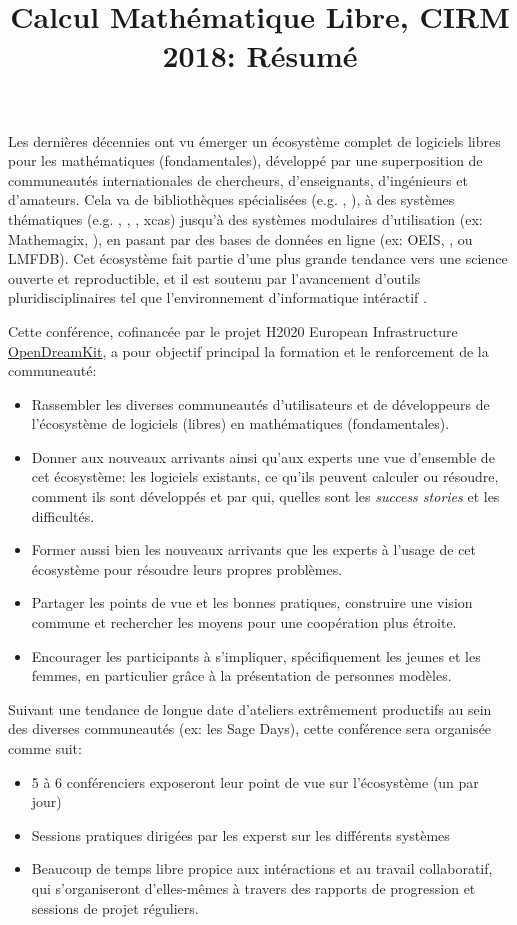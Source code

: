 \documentclass[12pt]{amsbook}
\begin{document}
\title{Calcul Mathématique Libre, CIRM 2018: Résumé}
\maketitle
Les dernières décennies ont vu émerger un écosystème complet de logiciels libres pour les mathématiques (fondamentales), développé par une  superposition de communeautés internationales de chercheurs, d'enseignants, d'ingénieurs et d'amateurs. Cela va de bibliothèques spécialisées (e.g. \MPIR, \Linbox), à des systèmes thématiques (e.g. \GAP, \Pari, \Singular, xcas) jusqu'à des systèmes  modulaires d'utilisation (ex: Mathemagix, \Sage), en pasant par des bases de données en ligne (ex: OEIS, \MathHub, ou LMFDB). Cet écosystème fait partie d'une plus grande tendance vers une science ouverte et reproductible,  et il est soutenu par l'avancement d'outils pluridisciplinaires tel que l'environnement d'informatique intéractif \Jupyter.


Cette conférence, cofinancée par le projet H2020 European Infrastructure  \href{opendreamkit.org}{OpenDreamKit}, a pour objectif principal la formation et le renforcement de la communeauté:

\begin{itemize}
\item Rassembler les diverses communeautés d'utilisateurs et de développeurs de l'écosystème de logiciels (libres) en mathématiques (fondamentales).
\item Donner aux nouveaux arrivants ainsi qu'aux experts une vue d'ensemble de cet écosystème: les logiciels existants, ce qu'ils peuvent calculer ou résoudre, comment ils sont développés et par qui, quelles sont les \textit{success stories} et les difficultés.
  \item Former aussi bien les nouveaux arrivants que les experts à l'usage de cet écosystème pour résoudre leurs propres problèmes.
\item Partager les points de vue et les bonnes pratiques, construire une vision commune et rechercher les moyens pour une coopération plus étroite.
\item Encourager les participants à s'impliquer, spécifiquement les jeunes et les femmes, en particulier grâce à la présentation de personnes modèles.
\end{itemize}


Suivant une tendance de longue date d'ateliers extrêmement productifs au sein des diverses communeautés (ex: les Sage Days), cette conférence sera organisée comme suit:
\begin{itemize}
\item 5 à 6 conférenciers exposeront leur point de vue sur l'écosystème (un par jour)
\item Sessions pratiques dirigées par les experst sur les différents systèmes
\item Beaucoup de temps libre propice aux intéractions et au travail collaboratif, qui s'organiseront d'elles-mêmes à travers des rapports de progression et sessions de projet réguliers.
\end{itemize}
\end{document}
